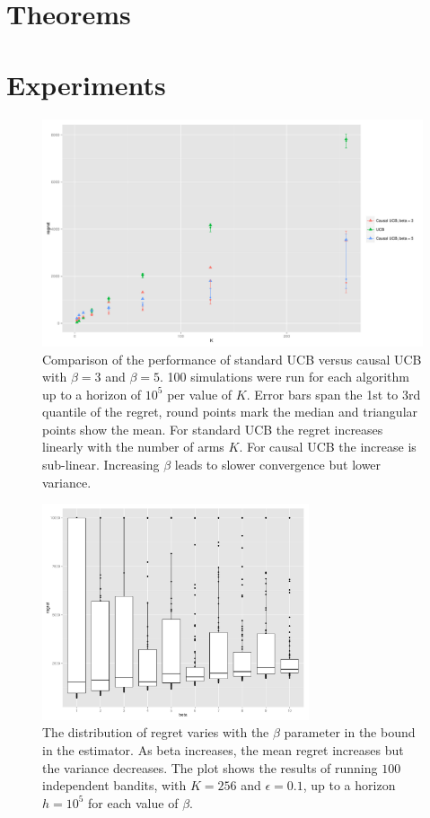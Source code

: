\documentclass{article}
\theoremstyle{plain}
\theoremstyle{definition}
\begin{document}
\section{Theorems}
\section{Experiments}



\begin{figure}[h]
\caption{Comparison of the performance of standard UCB versus causal UCB with $\beta=3$ and $\beta = 5$. 100 simulations were run for each algorithm up to a horizon of $10^5$ per value of $K$. Error bars span the 1st to 3rd quantile of the regret, round points mark the median and triangular points show the mean. For standard UCB the regret increases linearly with the number of arms $K$. For causal UCB the increase is sub-linear. Increasing $\beta$ leads to slower convergence but lower variance.}
\includegraphics[width=1\textwidth]{regret_vs_K_series_beta.pdf}
\end{figure}

\begin{figure}[h]
\caption{The distribution of regret varies with the $\beta$ parameter in the bound in the estimator. As beta increases, the mean regret increases but the variance decreases. The plot shows the results of running $100$ independent bandits, with $K=256$ and $\epsilon=0.1$, up to a horizon $h=10^5$ for each value of $\beta$. }
\includegraphics[width=0.7\textwidth]{regret_vs_beta_boxplot.pdf}
\end{figure}
\end{document}
